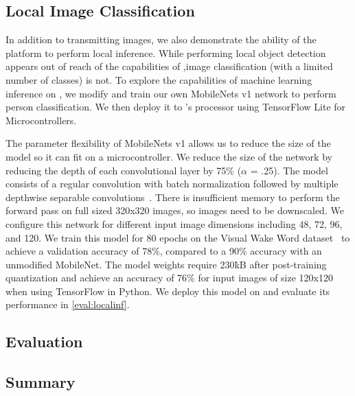 
\subsection{Local Image Classification}
In addition to transmitting images, we also demonstrate the ability of the platform to perform local inference.
While performing local object detection appears out of reach of the capabilities of \namec,image classification (with a limited number of classes) is not. 
To explore the capabilities of machine learning inference on \namec,
we modify and train our own MobileNets v1 network to perform person classification. We then deploy it to \namec's processor using TensorFlow Lite for Microcontrollers. 

The parameter flexibility of MobileNets v1 allows us to reduce the size of the model so it can fit on a microcontroller. We reduce the size of the network by reducing the depth of each convolutional layer by 75\% ($\alpha$ = .25).  
The model consists of a regular convolution with batch normalization followed by multiple depthwise separable convolutions~\cite{howard2017mobilenets}. 
There is insufficient memory to perform the forward pass on full sized 320x320 images, so images need to be downscaled. We configure this network for different input image dimensions including 48, 72, 96, and 120.
We train this model for 80 epochs on the Visual Wake Word dataset~\cite{chowdhery2019visual} to achieve a validation accuracy of 78\%, compared to a 90\% accuracy with an unmodified MobileNet. The model weights require 230\.kB after post-training quantization and achieve an accuracy of 76\% for input images of size 120x120 when using TensorFlow in Python. We deploy this model on \namec and evaluate its performance in \cref{eval:localinf}.

\subsection{Evaluation}


\subsection{Summary}

